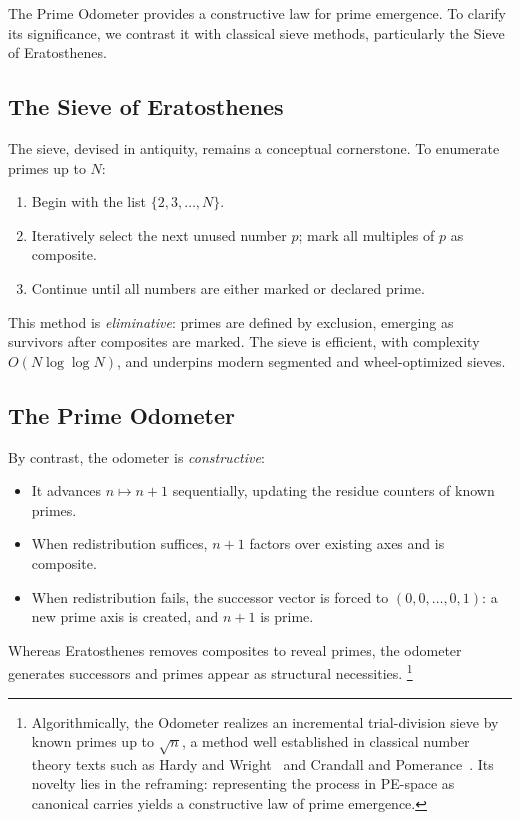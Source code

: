\documentclass[12pt]{article}
\theoremstyle{definition}
\theoremstyle{remark}
\begin{document}
The Prime Odometer provides a constructive law for prime emergence. To clarify its significance, we
contrast it with classical sieve methods, particularly the Sieve of Eratosthenes.

\subsection{The Sieve of Eratosthenes}

The sieve, devised in antiquity, remains a conceptual cornerstone. To enumerate primes up to $N$:

\begin{enumerate}
  \item Begin with the list $\{2,3,\dots,N\}$.
  \item Iteratively select the next unused number $p$; mark all multiples of $p$ as composite.
  \item Continue until all numbers are either marked or declared prime.
\end{enumerate}

This method is \emph{eliminative}: primes are defined by exclusion, emerging as survivors after
composites are marked. The sieve is efficient, with complexity $O(N \log \log N)$, and underpins
modern segmented and wheel-optimized sieves.

\subsection{The Prime Odometer}

By contrast, the odometer is \emph{constructive}:

\begin{itemize}
  \item It advances $n \mapsto n+1$ sequentially, updating the residue counters of known primes.
  \item When redistribution suffices, $n+1$ factors over existing axes and is composite.
  \item When redistribution fails, the successor vector is forced to $(0,0,\dots,0,1)$:
        a new prime axis is created, and $n+1$ is prime.
\end{itemize}

Whereas Eratosthenes removes composites to reveal primes, the odometer generates successors and
primes appear as structural necessities.
\footnote{Algorithmically, the Odometer realizes an incremental trial-division sieve by known primes up to $\sqrt{n}$, a method well established in classical number theory texts such as Hardy and Wright~\cite{hardywright} and Crandall and Pomerance~\cite{crandallpomerance}. Its novelty lies in the reframing: representing the process in PE-space as canonical carries yields a constructive law of prime emergence.}
\end{document}

